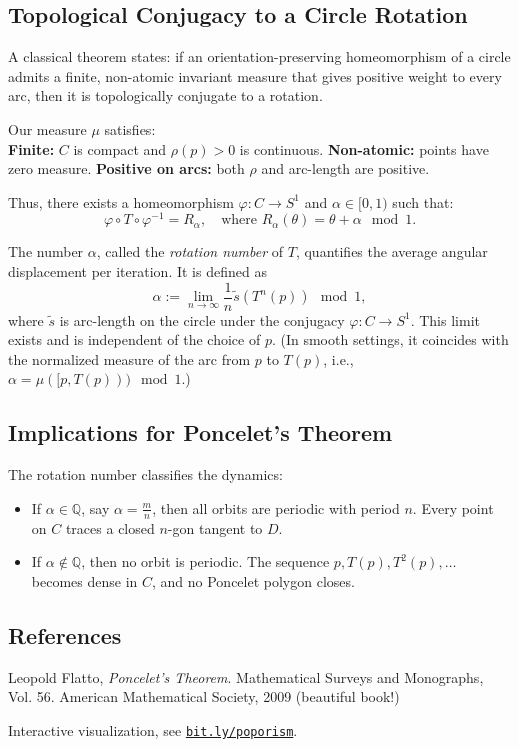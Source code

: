 \begin{technical}
  \subsection*{Topological Conjugacy to a Circle Rotation}
  A classical theorem states: if an orientation-preserving homeomorphism of a circle admits a finite, non-atomic invariant measure that gives positive weight to every arc, then it is topologically conjugate to a rotation.
  
  Our measure \( \mu \) satisfies:\\
  \textbf{Finite:} \( C \) is compact and \( \rho(p) > 0 \) is continuous. \textbf{Non-atomic:} points have zero measure. \textbf{Positive on arcs:} both \( \rho \) and arc-length are positive.
  
  Thus, there exists a homeomorphism \( \varphi: C \to S^1 \) and \( \alpha \in [0,1) \) such that:
  \[
  \varphi \circ T \circ \varphi^{-1} = R_\alpha, \quad \text{where } R_\alpha(\theta) = \theta + \alpha \mod 1.
  \]
  
  The number \( \alpha \), called the \emph{rotation number} of \( T \), quantifies the average angular displacement per iteration. It is defined as
  \[
  \alpha := \lim_{n \to \infty} \frac{1}{n} \tilde{s}(T^n(p)) \mod 1,
  \]
  where \( \tilde{s} \) is arc-length on the circle under the conjugacy \( \varphi: C \to S^1 \). This limit exists and is independent of the choice of \( p \). (In smooth settings, it coincides with the normalized measure of the arc from \( p \) to \( T(p) \), i.e., \( \alpha = \mu([p, T(p))) \mod 1 \).)
  
  \subsection*{Implications for Poncelet’s Theorem}
  
  The rotation number classifies the dynamics:
  \begin{itemize}
    \item If \( \alpha \in \mathbb{Q} \), say \( \alpha = \frac{m}{n} \), then all orbits are periodic with period \( n \). Every point on \( C \) traces a closed \( n \)-gon tangent to \( D \).
    \item If \( \alpha \notin \mathbb{Q} \), then no orbit is periodic. The sequence \( p, T(p), T^2(p), \ldots \) becomes dense in \( C \), and no Poncelet polygon closes.
  \end{itemize}
  
  \subsection*{References}
  Leopold Flatto, \textit{Poncelet’s Theorem}. Mathematical Surveys and Monographs, Vol. 56. American Mathematical Society, 2009 (beautiful book!)
  
  Interactive visualization, see \href{https://bit.ly/poporism}{\texttt{bit.ly/poporism}}.
  \end{technical}
  